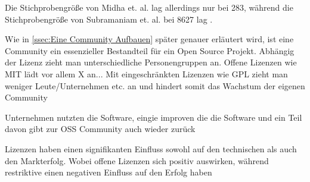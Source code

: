 Die Stichprobengröße von Midha et. al. lag allerdings nur bei 283, %
während die Stichprobengröße von Subramaniam et. al. bei 
8627 lag \cite{subramaniamDeterminantsOpenSource2009}. %



Wie in \ref{ssec:Eine Community Aufbauen} später genauer erläutert wird, ist eine Community ein 
essenzieller Bestandteil für ein Open Source Projekt.
Abhängig der Lizenz zieht man unterschiedliche Personengruppen an.
Offene Lizenzen wie MIT lädt vor allem X an...
Mit eingeschränkten Lizenzen wie GPL zieht man weniger Leute/Unternehmen etc. an und hindert 
somit das Wachstum der eigenen Community 

Unternehmen nutzten die Software, 
eingie improven die die Software und ein Teil davon gibt zur OSS Community auch wieder zurück 
\cite{bangerthWhatMakesComputational2013} %

\bigskip

\begin{hypothesis}
    Lizenzen haben einen signifikanten Einfluss sowohl auf den technischen
    als auch den Markterfolg. 
    Wobei offene Lizenzen sich positiv auswirken, während restriktive einen negativen
    Einfluss auf den Erfolg haben
\end{hypothesis}
